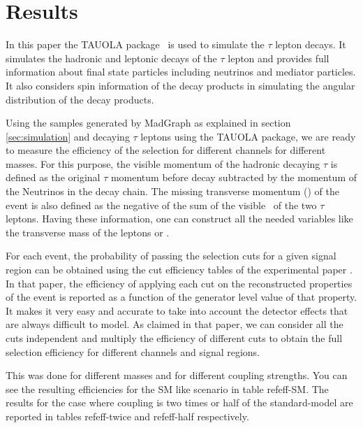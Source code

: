 \section{Results}\label{sec:results} 


In this paper the TAUOLA package~\cite{Davidson:2010rw} is used to simulate the $\tau$ lepton decays. It simulates the hadronic and leptonic decays of the $\tau$ lepton and provides full information about final state particles including neutrinos and mediator particles. It also considers spin information of the decay products in simulating the angular distribution of the decay products.

Using the \wprime samples generated by MadGraph as explained in section \ref{sec:simulation} and decaying $\tau$ leptons using the TAUOLA package, we are ready to measure the efficiency of the selection for different channels for different \wprime masses. For this purpose, the visible momentum of the hadronic decaying $\tau$ is defined as the original $\tau$ momentum before decay subtracted by the momentum of the Neutrinos in the decay chain. The missing transverse momentum (\MET) of the event is also defined as the negative of the sum of the visible \pt ~of the two $\tau$ leptons. Having these information, one can construct all the needed variables like the transverse mass of the leptons or \mttwo. 

For each event, the probability of passing the selection cuts for a given signal region can be obtained using the cut efficiency tables of the experimental paper \cite{Khachatryan:2016trj}. In that paper, the efficiency of applying each cut on the reconstructed properties of the event is reported as a function of the generator level value of that property. It makes it very easy and accurate to take into account the detector effects that are always difficult to model. As claimed in that paper, we can consider all the cuts independent and multiply the efficiency of different cuts to obtain the full selection efficiency for different channels and signal regions.

This was done for different \wprime masses and for different coupling strengths. You can see the resulting efficiencies for the SM like scenario in table ref{eff-SM}. The results for the case where coupling is two times or half of the standard-model are reported in tables ref{eff-twice} and ref{eff-half} respectively.



